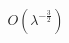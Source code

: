 \documentclass[preview]{standalone}
\begin{document}
\begin{align*}
O(\lambda^{-\frac{3}{2}})
\end{align*}
\end{document}
